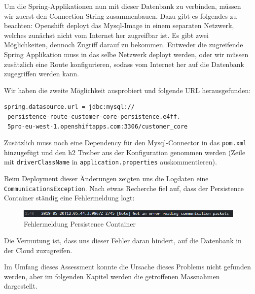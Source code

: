 \documentclass[12pt,a4paper]{article}
\begin{document}
Um die Spring-Applikationen nun mit dieser Datenbank zu verbinden, müssen wir zuerst den Connection String zusammenbauen. Dazu gibt es folgendes zu beachten: Openshift deployt das Mysql-Image in einem separaten Netzwerk, welches zunächst nicht vom Internet her zugreifbar ist. Es gibt zwei Möglichkeiten, dennoch Zugriff darauf zu bekommen. Entweder die zugreifende Spring Applikation muss in das selbe Netzwerk deployt werden, oder wir müssen zusätzlich eine Route konfigurieren, sodass vom Internet her auf die Datenbank zugegriffen werden kann. 

Wir haben die zweite Möglichkeit ausprobiert und folgende URL herausgefunden:
\begin{lstlisting}
spring.datasource.url = jdbc:mysql://
 persistence-route-customer-core-persistence.e4ff.
 5pro-eu-west-1.openshiftapps.com:3306/customer_core
\end{lstlisting}
Zusätzlich muss noch eine Dependency für den Mysql-Connector in das \texttt{pom.xml} hinzugefügt und den h2 Treiber aus der Konfiguration genommen werden (Zeile mit \texttt{driver\-ClassName} in \texttt{application.properties} auskommentieren). 

Beim Deployment dieser Änderungen zeigten uns die Logdaten eine \texttt{Com\-munications\-Exception}. Nach etwas Recherche fiel auf, dass der Persistence Container ständig eine Fehlermeldung logt:

\begin{figure}[h]
	\centering
	\includegraphics[width=1\linewidth]{img/os-persistence-error}
	\caption{Fehlermeldung Persistence Container}
	\label{fig:os-persistence-error}
\end{figure}

Die Vermutung ist, dass uns dieser Fehler daran hindert, auf die Datenbank in der Cloud zuzugreifen. 
 
Im Umfang dieses Assessment konnte die Ursache dieses Problems nicht gefunden werden, aber im folgenden Kapitel werden die getroffenen Massnahmen dargestellt.
\end{document}
